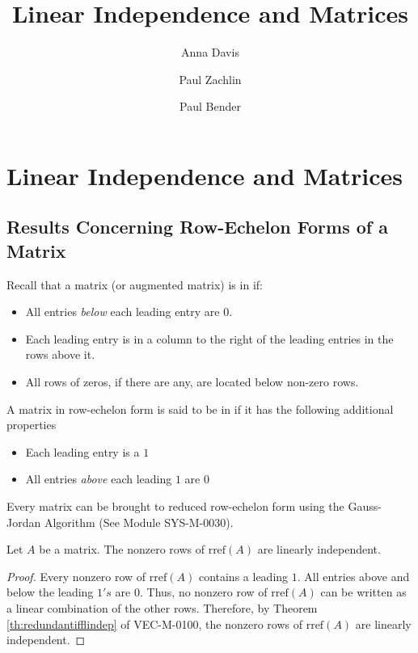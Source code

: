 \documentclass{ximera}
\author{Anna Davis \and Paul Zachlin \and Paul Bender} \title{Linear Independence and Matrices} \license{CC-BY 4.0}
\begin{document}
\begin{abstract}
\end{abstract}
\maketitle


\section*{Linear Independence and Matrices}
\subsection{Results Concerning Row-Echelon Forms of a Matrix}

Recall that a matrix (or augmented matrix) is in  if:
\begin{itemize}
\item All entries {\it below} each leading entry are $0$.
\item Each leading entry is in a column to the right of the leading entries in the rows above it.
\item All rows of zeros, if there are any, are located below non-zero rows.
\end{itemize}

A matrix in row-echelon form is said to be in  if it has the following additional properties
\begin{itemize}
\item Each leading entry is a $1$
\item All entries {\it above} each leading $1$ are $0$
\end{itemize}

Every matrix can be brought to reduced row-echelon form using the Gauss-Jordan Algorithm (See Module SYS-M-0030).

\begin{theorem}\label{th:rowsrreflinind}
Let $A$ be a matrix.  The nonzero rows of $\mbox{rref}(A)$ are linearly independent.
\end{theorem}
\begin{proof}
Every nonzero row of $\mbox{rref}(A)$ contains a leading $1$.  All entries above and below the leading $1's$ are $0$.  Thus, no nonzero row of $\mbox{rref}(A)$ can be written as a linear combination of the other rows.  Therefore, by Theorem \ref{th:redundantifflindep} of VEC-M-0100, the nonzero rows of $\mbox{rref}(A)$ are linearly independent.
\end{proof}
\end{document}
